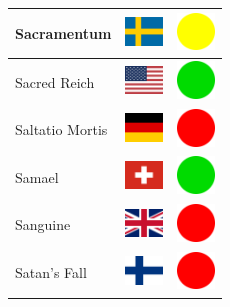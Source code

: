 \documentclass[12pt, a4paper, twoside]{report}
\begin{document}
\begin{center}
\begin{longtable}{|p{5cm}|p{2cm}|p{2cm}|}
Sacramentum﻿ & \includegraphics[width=1cm]{4x3/se} & \includegraphics[width=1cm]{likes/m} \\ \hline
Sacred Reich & \includegraphics[width=1cm]{4x3/us} & \includegraphics[width=1cm]{likes/y} \\ \hline
Saltatio Mortis & \includegraphics[width=1cm]{4x3/de} & \includegraphics[width=1cm]{likes/n} \\ \hline
Samael & \includegraphics[width=1cm]{4x3/ch} & \includegraphics[width=1cm]{likes/y} \\ \hline
Sanguine & \includegraphics[width=1cm]{4x3/gb} & \includegraphics[width=1cm]{likes/n} \\ \hline
Satan's Fall & \includegraphics[width=1cm]{4x3/fi} & \includegraphics[width=1cm]{likes/n} \\ \hline

\end{longtable}
\end{center}
\end{document}
